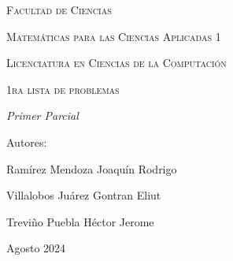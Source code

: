 \documentclass{book}
\begin{document}
\begin{titlepage}
        \vspace{1cm}
        {\scshape\Large Facultad de Ciencias \par}
        \vspace{1cm}
        {\scshape\Large Matemáticas para las Ciencias Aplicadas 1 \par}
        \vspace{1cm}
        {\scshape\Large Licenciatura en Ciencias de la Computación \par}
        \vspace{1cm}
        {\scshape\Huge 1ra lista de problemas  \par}
        \vspace{3cm}
        {\itshape\Large Primer Parcial \par}
        \vfill
        {\Large Autores: \par}
        {\Large Ramírez Mendoza Joaquín Rodrigo \par}
        {\Large Villalobos Juárez Gontran Eliut\par}
        {\Large Treviño Puebla Héctor Jerome \par}
        \vfill
        {\Large Agosto 2024 \par}
    \end{titlepage}
    \maketitle




\end{document}
